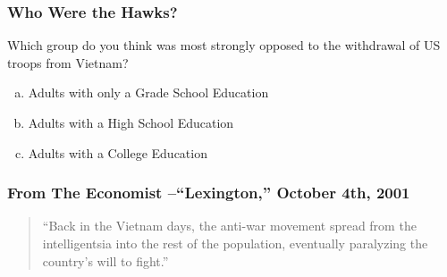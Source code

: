 \documentclass[handout]{beamer}
\begin{document}
\begin{frame}
\frametitle{Who Were the Hawks?}
Which group do you think was most strongly \alert{opposed to} the withdrawal of US troops from Vietnam?
\begin{enumerate}[(a)]
	\item Adults with only a Grade School Education
	\item Adults with a High School Education
	\item Adults with a College Education
\end{enumerate}

\end{frame}
\begin{frame}
\frametitle{From The Economist --``Lexington,'' October 4th, 2001}
\begin{quote}
 ``Back in the Vietnam days, the anti-war movement spread from the intelligentsia into the rest of the population, eventually paralyzing the country's will to fight.''
\end{quote}

\end{frame}

\end{document}
